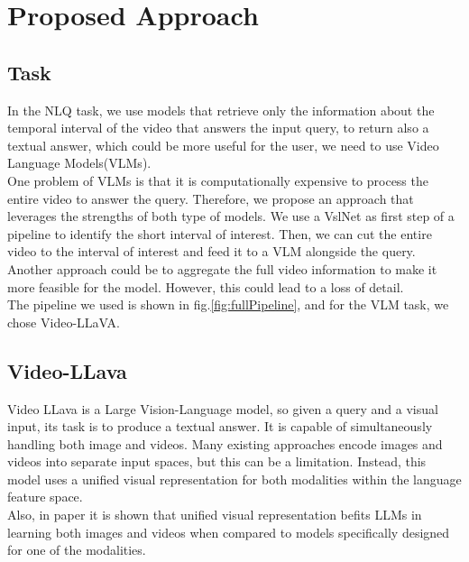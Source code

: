 \documentclass[conference]{IEEEtran}
\begin{document}
\begin{table}[h]
\centering
\caption{Pre-computed Features for Ego4D}
\label{tab:precomputedfeatures}
\setlength{\tabcolsep}{4pt} 
\renewcommand{\arraystretch}{1.2}
\end{table}


\section{Proposed Approach}
\subsection{Task}
In the NLQ task, we use models that retrieve only the
information about the temporal interval of the video that
answers the input query, to return also a textual answer,
which could be more useful for the user, we need to use
Video Language Models(VLMs).\\
One problem of VLMs is that it is computationally expensive to process the entire video to answer the query. Therefore, we propose an approach that leverages the strengths of both type of models. We use a VslNet as first step of a pipeline to identify the short interval of interest. Then, we can cut the entire video to the interval of interest and feed it to a VLM alongside the query.
Another approach could be to aggregate the full video information to make it more feasible for the model. However, this could lead to a loss of detail.\\

The pipeline we used is shown in fig.\ref{fig:fullPipeline}, and for the VLM task, we chose Video-LLaVA.

\subsection{Video-LLava}
Video LLava is a Large Vision-Language model, so given a query and a visual input, its task is to produce a textual answer.  It is capable of simultaneously handling both image and videos. Many existing approaches encode images and videos into separate input spaces, but this can be a limitation. Instead, this model uses a unified visual representation for both modalities within the language feature space.\\
Also, in paper \cite{b8} it is shown that unified visual representation befits LLMs in learning both images and videos when compared to models specifically designed for one of the modalities.
\end{document}
